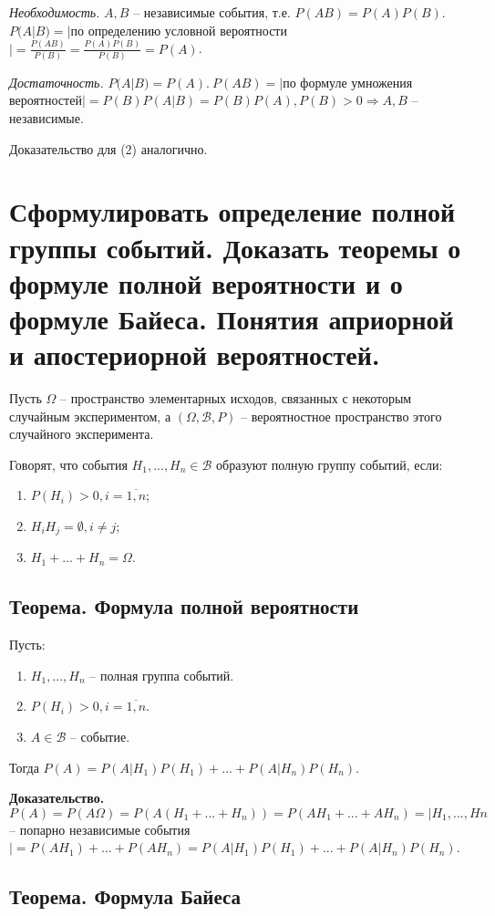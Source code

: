\textit{Необходимость.} $A, B$ -- независимые события, т.е. $P(AB) = P(A)P(B)$. $P(A|B) = |$по определению условной вероятности$| = \frac{P(AB)}{P(B)} = \frac{P(A)P(B)}{P(B)} = P(A)$.

\textit{Достаточность.} $P(A|B) = P(A).~P(AB) = |$по формуле умножения вероятностей$|= P(B)P(A|B) = P(B)P(A), P(B) > 0 \Rightarrow A, B$ -- независимые.

Доказательство для (2) аналогично.

\section{Сформулировать определение полной группы событий. Доказать теоремы о формуле полной вероятности и о формуле Байеса. Понятия априорной и апостериорной вероятностей.}

Пусть $\Omega$ -- пространство элементарных исходов, связанных с некоторым случайным экспериментом, а $(\Omega, \mathcal{B}, P)$ -- вероятностное пространство этого случайного эксперимента.

Говорят, что события $H_1, ..., H_n \in \mathcal{B}$ образуют полную группу событий, если:
\begin{enumerate}[label=\arabic*)]
	\item $P(H_i) > 0, i = \overline{1, n}$;
	\item $H_iH_j = \emptyset, i \neq j$;
	\item $H_1 + ... + H_n = \Omega$.
\end{enumerate}

\subsection*{Теорема. Формула полной вероятности}

Пусть: 
\begin{enumerate}
	\item $H_1, ..., H_n$ -- полная группа событий.
	\item $P(H_i)>0, i = \overline{1,n}$.
	\item $A \in \mathcal{B}$ -- событие.
\end{enumerate}
Тогда $P(A) = P(A|H_1)P(H_1)+...+P(A|H_n)P(H_n)$.

\textbf{Доказательство.} $P(A) = P(A\Omega) = P(A(H_1 + ... + H_n)) = P(AH_1 + ... + AH_n) = |H_1, ..., Hn$ -- попарно независимые события$| = P(AH_1) + ... + P(AH_n) = P(A|H_1)P(H_1) + ... + P(A|H_n)P(H_n)$.

\subsection*{Теорема. Формула Байеса}

